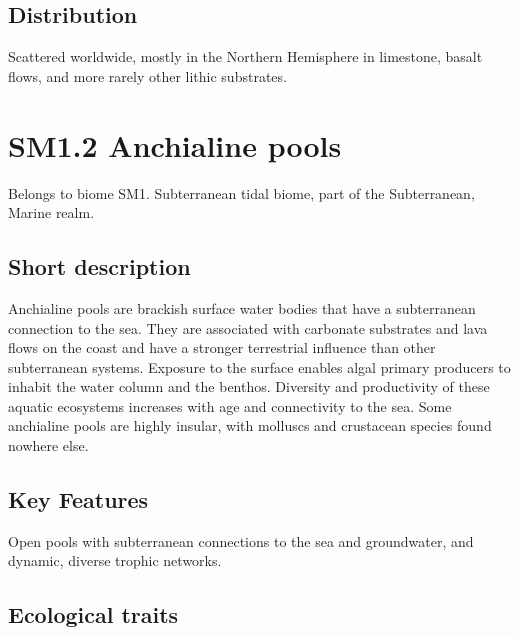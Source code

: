 \documentclass[
  letterpaper,
  DIV=11,
  numbers=noendperiod]{scrartcl}
\begin{document}
\subsection{Distribution}\label{distribution-66}

Scattered worldwide, mostly in the Northern Hemisphere in limestone,
basalt flows, and more rarely other lithic substrates.

\section{SM1.2 Anchialine pools}\label{sm1.2-anchialine-pools}

Belongs to biome SM1. Subterranean tidal biome, part of the
Subterranean, Marine realm.

\subsection{Short description}\label{short-description-67}

Anchialine pools are brackish surface water bodies that have a
subterranean connection to the sea. They are associated with carbonate
substrates and lava flows on the coast and have a stronger terrestrial
influence than other subterranean systems. Exposure to the surface
enables algal primary producers to inhabit the water column and the
benthos. Diversity and productivity of these aquatic ecosystems
increases with age and connectivity to the sea. Some anchialine pools
are highly insular, with molluscs and crustacean species found nowhere
else.

\subsection{Key Features}\label{key-features-67}

Open pools with subterranean connections to the sea and groundwater, and
dynamic, diverse trophic networks.

\subsection{Ecological traits}\label{ecological-traits-67}
\end{document}
